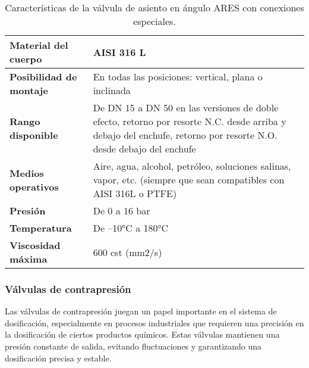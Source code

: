 \begin{table}[H]
    \centering
    \caption{Características de la válvula de asiento en ángulo ARES con conexiones especiales.}
    \label{table:ares_angle_valve}
    \begin{tabular}{| L{6cm} | L{6cm} |}
        \hline
        \textbf{Material del cuerpo}    & AISI 316 L                                                                                                                                                       \\

        \hline
        \textbf{Posibilidad de montaje} & En todas las posiciones: vertical, plana o inclinada                                                                                                             \\
        \hline
        \textbf{Rango disponible}       & De DN 15 a DN 50 en las versiones de doble efecto, retorno por resorte N.C. desde arriba y debajo del enchufe, retorno por resorte N.O. desde debajo del enchufe \\
        \hline
        \textbf{Medios operativos}      & Aire, agua, alcohol, petróleo, soluciones salinas, vapor, etc. (siempre que sean compatibles con AISI 316L o PTFE)                                               \\
        \hline
        \textbf{Presión}                & De 0 a 16 bar                                                                                                                                                    \\
        \hline
        \textbf{Temperatura}            & De –10°C a 180°C                                                                                                                                                 \\
        \hline
        \textbf{Viscosidad máxima}      & 600 cst (mm2/s)                                                                                                                                                  \\
        \hline
    \end{tabular}
\end{table}


\subsubsection{Válvulas de contrapresión}

Las válvulas de contrapresión juegan un papel importante en el sistema de dosificación, especialmente en procesos industriales
que requieren una precisión en la dosificación de ciertos productos químicos. Estas válvulas mantienen una presión constante
de salida, evitando fluctuaciones y garantizando una dosificación precisa y estable.


